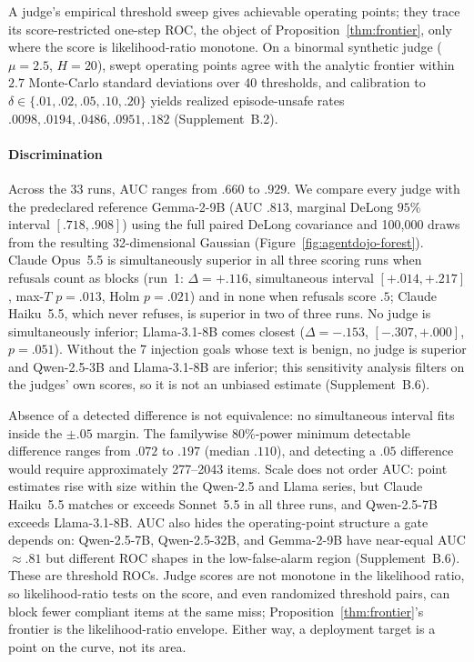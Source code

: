A judge's empirical threshold sweep gives achievable operating points; they trace its
score-restricted one-step ROC, the object of Proposition~\ref{thm:frontier}, only where the
score is likelihood-ratio monotone. On a binormal synthetic judge
($\mu=2.5$, $H=20$), swept operating points agree with the analytic frontier
within $2.7$ Monte-Carlo standard deviations over 40 thresholds, and
calibration to $\delta\in\{.01,.02,.05,.10,.20\}$ yields realized
episode-unsafe rates $.0098,.0194,.0486,.0951,.182$ (Supplement~B.2).

\paragraph{Discrimination}
Across the 33 runs, AUC ranges from $.660$ to $.929$. We compare every judge with
the predeclared reference Gemma-2-9B (AUC $.813$, marginal DeLong $95\%$ interval
$[.718,.908]$) using the full paired DeLong covariance and 100,000 draws from the
resulting 32-dimensional Gaussian (Figure~\ref{fig:agentdojo-forest}). Claude
Opus~5.5 is simultaneously superior in all three scoring runs when refusals count
as blocks (run~1: $\Delta=+.116$, simultaneous interval $[+.014,+.217]$, max-$T$
$p=.013$, Holm $p=.021$) and in none when refusals score $.5$; Claude Haiku~5.5,
which never refuses, is superior in two of three runs. No judge is simultaneously
inferior; Llama-3.1-8B comes closest ($\Delta=-.153$, $[-.307,+.000]$, $p=.051$).
Without the 7 injection goals whose text is benign, no judge is superior and
Qwen-2.5-3B and Llama-3.1-8B are inferior; this sensitivity analysis filters on
the judges' own scores, so it is not an unbiased estimate (Supplement~B.6).

Absence of a detected difference is not equivalence: no simultaneous interval
fits inside the $\pm.05$ margin. The familywise 80\%-power minimum detectable
difference ranges from $.072$ to $.197$ (median $.110$), and detecting a $.05$
difference would require approximately 277--2043 items. Scale does not order AUC: point estimates rise with size within the Qwen-2.5 and Llama
series, but Claude Haiku~5.5 matches or exceeds Sonnet~5.5 in all three runs, and
Qwen-2.5-7B exceeds Llama-3.1-8B. AUC also hides the operating-point structure a
gate depends on: Qwen-2.5-7B, Qwen-2.5-32B, and Gemma-2-9B have near-equal AUC
$\approx.81$ but different ROC shapes in the low-false-alarm region
(Supplement~B.6). These are threshold ROCs. Judge scores are not monotone in the likelihood
ratio, so likelihood-ratio tests on the score, and even randomized threshold pairs, can block fewer compliant items at the same miss; Proposition~\ref{thm:frontier}'s frontier is the
likelihood-ratio envelope. Either way, a deployment target is a point on the
curve, not its area.

